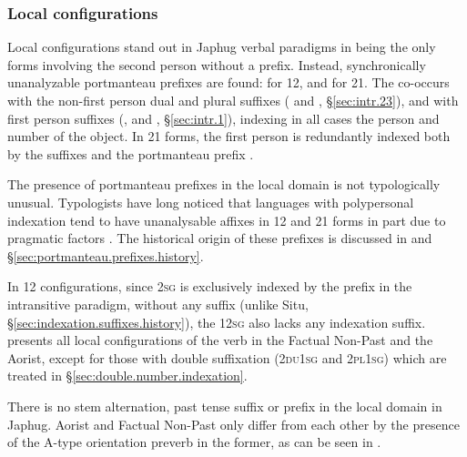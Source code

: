 \subsubsection{Local configurations} \label{sec:indexation.local}
  
Local configurations stand out in Japhug verbal paradigms in being the only forms involving the second person without a  prefix. Instead, synchronically unanalyzable portmanteau prefixes are found:  for 1\fl{}2, and  for 2\fl{}1. The  co-occurs with the non-first person dual and plural suffixes ( and , §\ref{sec:intr.23}), and  with first person suffixes (,  and , §\ref{sec:intr.1}), indexing in all cases the person and number of the object. In 2\fl{}1 forms, the first person is redundantly indexed both by the suffixes and the portmanteau prefix . 

The presence of portmanteau prefixes in the local domain is not typologically unusual. Typologists have long noticed that languages with polypersonal indexation tend to have unanalysable affixes in 1\fl{}2 and 2\fl{}1 forms \citep{heath98skewing} in part due to pragmatic factors \citep{delancey18sociopragmatic}. The historical origin of these prefixes is discussed in \citet{jacques18generic} and §\ref{sec:portmanteau.prefixes.history}.

In 1\fl{}2 configurations, since \textsc{2sg} is exclusively indexed by the  prefix in the intransitive paradigm, without any suffix (unlike Situ, §\ref{sec:indexation.suffixes.history}), the 1\fl{}\textsc{2sg} also lacks any indexation suffix.  presents all local configurations of the verb  in the Factual Non-Past and the Aorist, except for those with double suffixation (\textsc{2du}\fl{}\textsc{1sg} and \textsc{2pl}\fl{}\textsc{1sg}) which are treated in §\ref{sec:double.number.indexation}. 

There is no stem alternation,  past tense suffix or  prefix in the local domain in Japhug. Aorist and Factual Non-Past only differ from each other by the presence of the A-type orientation preverb in the former, as can be seen in .

